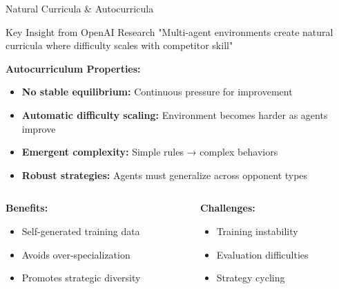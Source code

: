 \documentclass[aspectratio=169]{beamer}
\begin{document}
\begin{frame}{Natural Curricula \& Autocurricula}
    
    \begin{block}{Key Insight from OpenAI Research}
        "Multi-agent environments create natural curricula where difficulty scales with competitor skill"
    \end{block}
    
    \vfill
    
    \textbf{Autocurriculum Properties:}
    \begin{itemize}
        \item \textbf{No stable equilibrium:} Continuous pressure for improvement
        \item \textbf{Automatic difficulty scaling:} Environment becomes harder as agents improve  
        \item \textbf{Emergent complexity:} Simple rules → complex behaviors \autocite{bansal_emergent_2018}
        \item \textbf{Robust strategies:} Agents must generalize across opponent types
    \end{itemize}
    
    \vfill
    
    \begin{columns}
        \begin{column}{0.5\textwidth}
            \textbf{Benefits:}
            \begin{itemize}
                \item Self-generated training data
                \item Avoids over-specialization
                \item Promotes strategic diversity
            \end{itemize}
        \end{column}
        \begin{column}{0.5\textwidth}
            \textbf{Challenges:}
            \begin{itemize}
                \item Training instability
                \item Evaluation difficulties
                \item Strategy cycling
            \end{itemize}
        \end{column}
    \end{columns}
\end{frame}
\end{document}
